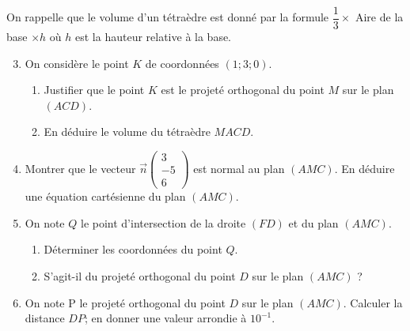 \documentclass[11pt,fleqn, openany]{book} %
\begin{document}
\begin{exercise}
On rappelle que le volume d'un tétraèdre est donné par la formule $\dfrac{1}{3} \times$ Aire de la base $\times
 h$ où $h$ est la hauteur relative à la base.
\begin{enumerate}
\setcounter{enumi}{2}
\item On considère le point $K$ de coordonnées $(1; 3; 0)$.
\begin{enumerate}
\item Justifier que le point $K$ est le projeté orthogonal du point $M$ sur le plan $(ACD)$.
\item En déduire le volume du tétraèdre $MACD$.\end{enumerate}
\item Montrer que le vecteur $\vec n \begin{pmatrix}
3 \\ -5 \\ 6
\end{pmatrix}$ est normal au plan $(AMC)$. En déduire une équation cartésienne du plan $(AMC)$.
\item On note $Q$ le point d'intersection de la droite $(FD)$ et du plan $(AMC)$. 
\begin{enumerate}
\item Déterminer les coordonnées du point $Q$.
\item S'agit-il du projeté orthogonal du point $D$ sur le plan $(AMC)$ ?
\end{enumerate}
\item On note P le projeté orthogonal du point $D$ sur le plan $(AMC)$.
Calculer la distance $DP$; en donner une valeur arrondie à $10^{-1}$.\end{enumerate}\end{exercise}
\end{document}
